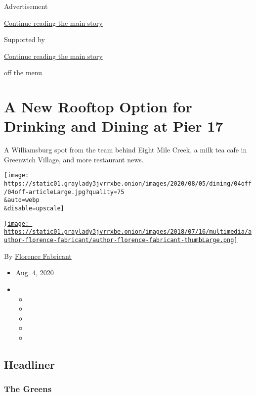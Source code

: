 Advertisement

\protect\hyperlink{after-top}{Continue reading the main story}

Supported by

\protect\hyperlink{after-sponsor}{Continue reading the main story}

off the menu

\hypertarget{a-new-rooftop-option-for-drinking-and-dining-at-pier-17}{%
\section{A New Rooftop Option for Drinking and Dining at Pier
17}\label{a-new-rooftop-option-for-drinking-and-dining-at-pier-17}}

A Williamsburg spot from the team behind Eight Mile Creek, a milk tea
cafe in Greenwich Village, and more restaurant news.

\texttt{[image: https://static01.graylady3jvrrxbe.onion/images/2020/08/05/dining/04off/04off-articleLarge.jpg?quality=75\\\&auto=webp\\\&disable=upscale]}

\href{https://www.nytimes3xbfgragh.onion/by/florence-fabricant}{\texttt{[image: https://static01.graylady3jvrrxbe.onion/images/2018/07/16/multimedia/author-florence-fabricant/author-florence-fabricant-thumbLarge.png]}}

By
\href{https://www.nytimes3xbfgragh.onion/by/florence-fabricant}{Florence
Fabricant}

\begin{itemize}
\item
  Aug. 4, 2020
\item
  \begin{itemize}
  \item
  \item
  \item
  \item
  \item
  \end{itemize}
\end{itemize}

\hypertarget{headliner}{%
\subsection{Headliner}\label{headliner}}

\hypertarget{the-greens}{%
\subsubsection{The Greens}\label{the-greens}}

